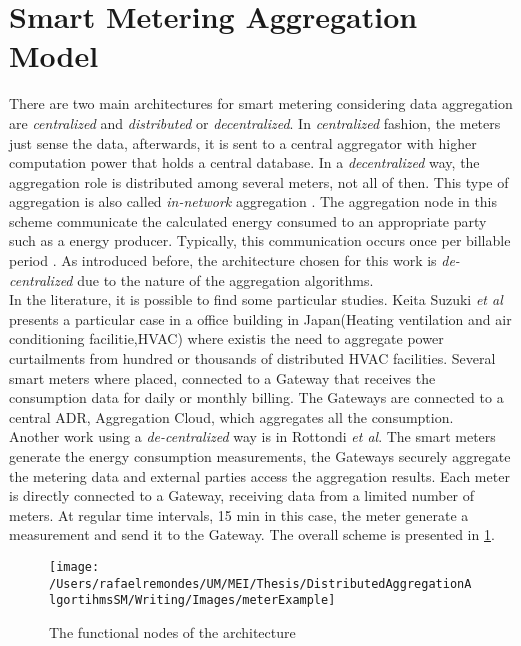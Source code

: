 \section{Smart Metering Aggregation Model} 
There are two main architectures for smart metering considering data aggregation  are \textit{centralized} and \textit{distributed} or \textit{ decentralized}\cite{journals/spm/ErkinTLP13}. In \textit{centralized} fashion, the meters just sense the data, afterwards, it is sent to a central aggregator with higher computation power that holds a central database. In a \textit{decentralized} way, the aggregation role is distributed among several meters, not all of then. This type of aggregation is also called  \textit{in-network} aggregation \cite{Girao2004c}\cite{Castelluccia05efficientaggregation}. The aggregation node in this scheme communicate the calculated energy consumed to an appropriate party such as a energy producer. Typically, this communication occurs once per billable period \cite{journals/spm/ErkinTLP13}. As introduced before, the architecture chosen for this work is \textit{de-centralized} due to the nature of the aggregation algorithms.\\
In the literature, it is possible to find some particular studies. Keita Suzuki \textit{et al} \cite{DBLP:conf/isgteurope/SuzukiNYKMKA13}  presents a particular case in a office building in Japan(Heating ventilation and air conditioning facilitie,HVAC) where existis the need to aggregate power curtailments from hundred or thousands of distributed HVAC facilities. Several smart meters where placed, connected to a Gateway that receives the consumption data for daily or monthly billing.  The Gateways are connected to a central ADR, Aggregation Cloud, which aggregates all the consumption.\\
Another work using a \textit{de-centralized} way is in Rottondi \textit{et al}\cite{rottondi2012}.  The smart meters generate the energy consumption measurements, the Gateways securely aggregate the metering data and external parties access the aggregation results. Each meter is directly connected to a Gateway, receiving data from a limited number of meters. At regular time intervals, 15 min in this case, the meter generate a measurement and send it to the Gateway. The overall scheme is presented in \ref{fig:meterArchitecture}.
\begin{figure}[h]
\centering
\texttt{[image: /Users/rafaelremondes/UM/MEI/Thesis/DistributedAggregationAlgortihmsSM/Writing/Images/meterExample]}
\caption{\label{fig:meterArchitecture} The functional nodes of the architecture}
\end{figure}

